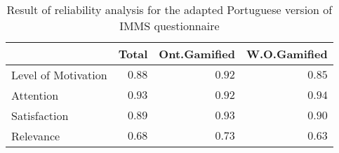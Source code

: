 \begin{table}[!htbp]
\caption{Result of reliability analysis for the adapted Portuguese version of IMMS questionnaire\label{rel}} 
\begin{center}
\begin{tabular}{lrrr}
\hline\hline
\multicolumn{1}{l}{}&\multicolumn{1}{c}{Total}&\multicolumn{1}{c}{Ont.Gamified}&\multicolumn{1}{c}{W.O.Gamified}\tabularnewline
\hline
Level of Motivation&$0.88$&$0.92$&$0.85$\tabularnewline
Attention&$0.93$&$0.92$&$0.94$\tabularnewline
Satisfaction&$0.89$&$0.93$&$0.90$\tabularnewline
Relevance&$0.68$&$0.73$&$0.63$\tabularnewline
\hline
\end{tabular}\end{center}

\end{table}

